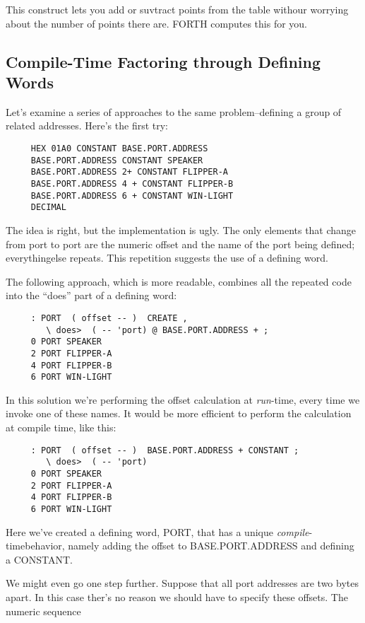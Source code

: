 This construct lets you add or suvtract points from the table withour worrying about the number of points there are. FORTH computes this for you.

\subsection{{Compile-Time Factoring through Defining Words}}

Let's examine a series of approaches to the same problem--defining a group of related addresses. Here's the first try:

\begin{verbatim}
     HEX 01A0 CONSTANT BASE.PORT.ADDRESS
     BASE.PORT.ADDRESS CONSTANT SPEAKER
     BASE.PORT.ADDRESS 2+ CONSTANT FLIPPER-A
     BASE.PORT.ADDRESS 4 + CONSTANT FLIPPER-B
     BASE.PORT.ADDRESS 6 + CONSTANT WIN-LIGHT
     DECIMAL
\end{verbatim}
The idea is right, but the implementation is ugly. The only elements that change from port to port are the numeric offset and the name of the port being defined; everythingelse repeats. This repetition suggests the use of a defining word.

The following approach, which is more readable, combines all the repeated code into the ``does'' part  of a defining word:

\begin{verbatim}
     : PORT  ( offset -- )  CREATE ,
        \ does>  ( -- 'port) @ BASE.PORT.ADDRESS + ;
     0 PORT SPEAKER
     2 PORT FLIPPER-A
     4 PORT FLIPPER-B
     6 PORT WIN-LIGHT
\end{verbatim}
In this solution we're performing the offset calculation at \emph{run}-time, every time we invoke one of these names. It would be more efficient to perform the calculation at compile time, like this:

\begin{verbatim}
     : PORT  ( offset -- )  BASE.PORT.ADDRESS + CONSTANT ;
        \ does>  ( -- 'port)
     0 PORT SPEAKER
     2 PORT FLIPPER-A
     4 PORT FLIPPER-B
     6 PORT WIN-LIGHT
\end{verbatim}
Here we've created a defining word, PORT, that has a unique \emph{compile}-timebehavior, namely adding the offset to BASE.PORT.ADDRESS and defining a CONSTANT.

We might even go one step further. Suppose that all port addresses are two bytes apart. In this case ther's no reason we should have to specify these offsets. The numeric sequence


